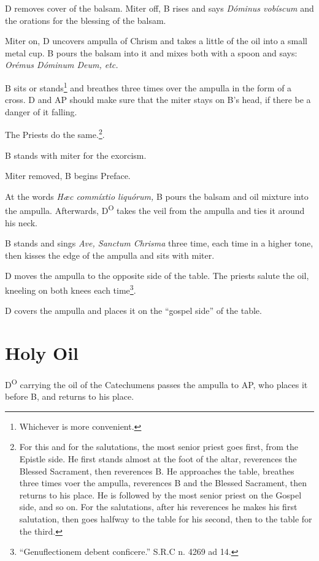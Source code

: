 {\rubric D removes cover of the balsam. Miter off, B rises and says
\textit{Dóminus vobíscum} and the orations for the blessing of the balsam.

\rubric Miter on, D uncovers ampulla of Chrism and takes a little of the oil
into a small metal cup. B pours the balsam into it and mixes both with a spoon
and says: \textit{Orémus Dóminum Deum, etc.}

\rubric B sits or stands\footnote{Whichever is more convenient.} and breathes
three times over the ampulla in the form of a cross. D and AP should make sure
that the miter stays on B's head, if there be a danger of it falling.

\rubric The Priests do the same.\footnote{For this and for the salutations, the
most senior priest goes first, from the Epistle side. He first stands almost at
the foot of the altar, reverences the Blessed Sacrament, then reverences B. He
approaches the table, breathes three times voer the ampulla, reverences B and
the Blessed Sacrament, then returns to his place. He is followed by the most
senior priest on the Gospel side, and so on. For the salutations, after his
reverences he makes his first salutation, then goes halfway to the table for
his second, then to the table for the third.}.

\rubric B stands with miter for the exorcism.

\rubric Miter removed, B begins Preface. 

\rubric At the words \textit{Hæc commíxtio liquórum,} B pours the balsam and
oil mixture into the ampulla. Afterwards, D\textsuperscript{O} takes the veil
from the ampulla and ties it around his neck.

\rubric B stands and sings \textit{Ave, Sanctum Chrisma} three time, each time
in a higher tone, then kisses the edge of the ampulla and sits with miter.

\rubric D moves the ampulla to the opposite side of the table. The priests
salute the oil, kneeling on both knees each time\footnote{``Genuflectionem
debent conficere.'' S.R.C n. 4269 ad 14.}.

\rubric D covers the ampulla and places it on the ``gospel side'' of the table.

\section{Holy Oil}

\rubric D\textsuperscript{O} carrying the oil of the Catechumens passes the
ampulla to AP, who places it before B, and returns to his place. 

}
